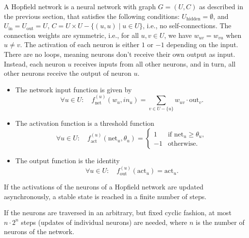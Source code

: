 \begin{definition}\label{HopfieldNetwork}
\leanok
A Hopfield network is a neural network with graph $G = (U,C)$ as described in the previous section, 
that satisfies the following conditions:
\( U_{\text{hidden}} = \emptyset \), and \( U_{\text{in}} = U_{\text{out}} = U \),
 \( C = U \times U - \{(u, u) \mid u \in U \} \), i.e., no self-connections. 
The connection weights are symmetric, i.e., for all \( u, v \in U \), we have \( w_{uv} = w_{vu} \) when \( u \neq v \). 
The activation of each neuron is either \( 1 \) or \( -1 \) depending on the input. There are no loops, meaning neurons don’t 
receive their own output as input. Instead, each neuron $u$ receives inputs from all other neurons, and in turn, all other neurons
 receive the output of neuron $u$. 
\begin{itemize}
\item The network input function is given by
    \[
  \forall u \in U : \quad f^{(u)}_{\text{net}}(w_u, in_u) = \sum_{v \in U - \{u\}} w_{uv} \cdot \text{out}_v.
  \]
\item The activation function is a threshold function
\[\forall u \in U : \quad f^{(u)}_{\text{act}}(\text{net}_u, \theta_u) =
  \begin{cases} 
    1 & \text{if } \text{net}_u \geq \theta_u, \\
    -1 & \text{otherwise}.
  \end{cases}
  \]
\item  The output function is the identity
\[\forall u \in U : \quad f^{(u)}_{\text{out}}(\text{act}_u) = \text{act}_u.
  \]
\end{itemize}
\end{definition}

\begin{theorem} \label{Convergence}
\leanok  
If the activations of the neurons of a Hopfield network are updated asynchronously,
a stable state is reached in a finite number of steps.
\end{theorem}

\begin{theorem} 
\label{ConvergenceCor}
\leanok  
If the neurons are 
traversed in an arbitrary, but fixed cyclic fashion, at most $n\cdot2^n$ steps
 (updates of individual neurons) are needed, where $n$ is the number of neurons of the network.
\end{theorem}

